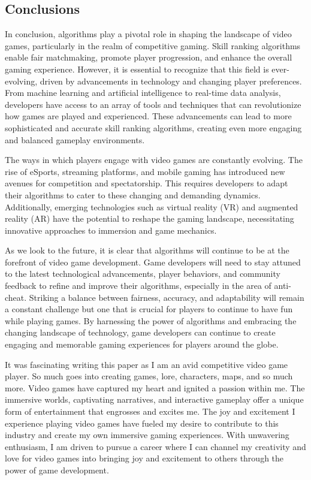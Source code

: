 \documentclass{article}
\theoremstyle{theorem}
\theoremstyle{definition}
\theoremstyle{remark}
\begin{document}
\subsection{Conclusions}

\medskip\indent
In conclusion, algorithms play a pivotal role in shaping the landscape of video games, particularly in the realm of competitive gaming. Skill ranking algorithms enable fair matchmaking, promote player progression, and enhance the overall gaming experience. However, it is essential to recognize that this field is ever-evolving, driven by advancements in technology and changing player preferences. From machine learning and artificial intelligence to real-time data analysis, developers have access to an array of tools and techniques that can revolutionize how games are played and experienced. These advancements can lead to more sophisticated and accurate skill ranking algorithms, creating even more engaging and balanced gameplay environments.

\medskip\indent
The ways in which players engage with video games are constantly evolving. The rise of eSports, streaming platforms, and mobile gaming has introduced new avenues for competition and spectatorship. This requires developers to adapt their algorithms to cater to these changing and demanding dynamics. Additionally, emerging technologies such as virtual reality (VR) and augmented reality (AR) have the potential to reshape the gaming landscape, necessitating innovative approaches to immersion and game mechanics.

\medskip\indent
As we look to the future, it is clear that algorithms will continue to be at the forefront of video game development. Game developers will need to stay attuned to the latest technological advancements, player behaviors, and community feedback to refine and improve their algorithms, especially in the area of anti-cheat. Striking a balance between fairness, accuracy, and adaptability will remain a constant challenge but one that is crucial for players to continue to have fun while playing games. By harnessing the power of algorithms and embracing the changing landscape of technology, game developers can continue to create engaging and memorable gaming experiences for players around the globe.

\medskip\indent
It was fascinating writing this paper as I am an avid competitive video game player. So much goes into creating games, lore, characters, maps, and so much more. Video games have captured my heart and ignited a passion within me. The immersive worlds, captivating narratives, and interactive gameplay offer a unique form of entertainment that engrosses and excites me. The joy and excitement I experience playing video games have fueled my desire to contribute to this industry and create my own immersive gaming experiences. With unwavering enthusiasm, I am driven to pursue a career where I can channel my creativity and love for video games into bringing joy and excitement to others through the power of game development.
\end{document}
